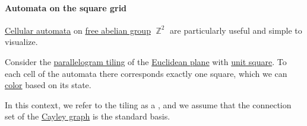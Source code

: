 \paragraph{Automata on the square grid}

\begin{remark}\label{rem:automata_on_square_grid}
  \hyperref[def:cellular_automaton]{Cellular automata} on \hyperref[def:free_abelian_group]{free abelian group} \( \BbbZ^2 \) are particularly useful and simple to visualize.

  Consider the \hyperref[def:parallelogram_tiling]{parallelogram tiling} of the \hyperref[def:euclidean_plane]{Euclidean plane} with \hyperref[def:unit_hypercube]{unit square}. To each cell of the automata there corresponds exactly one square, which we can \hyperref[def:set_coloring]{color} based on its state.

  In this context, we refer to the tiling as a , and we assume that the connection set of the \hyperref[def:cayley_graph]{Cayley graph} is the standard basis.
\end{remark}


